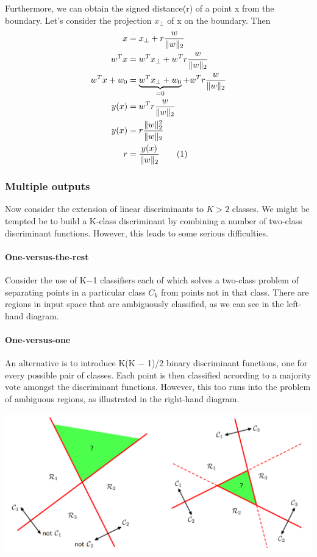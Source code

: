 \documentclass[main.tex]{subfiles}
\newcommand\numberthis{\addtocounter{equation}{1}\tag{\theequation}}
\begin{document}
Furthermore, we can obtain the signed distance(r) of a point x from the boundary. Let's consider the projection $x_{\perp}$ of x on the boundary. Then
\begin{align*}
    x &= x_{\perp} + r\frac{w}{\| w \|_2} \\
    w^Tx &= w^T x_{\perp} + w^T r\frac{w}{\| w \|_2} \\
    w^Tx + w_0 &= \underbrace{w^T x_{\perp} + w_0}_{=0} + w^T r\frac{w}{\| w \|_2} \\
    y(x) &= w^T r\frac{w}{\| w \|_2} \\
    y(x) &= r\frac{\| w \|_2^2}{\| w \|_2} \\
    r &= \frac{y(x)}{\| w \|_2} \numberthis
\end{align*}

\subsubsection{Multiple outputs}
Now consider the extension of linear discriminants to $K>2$ classes. We might be tempted be to build a K-class discriminant by combining a number of two-class discriminant functions. However, this leads to some serious difficulties.
\paragraph{One-versus-the-rest}
Consider the use of K−1 classifiers each of which solves a two-class problem of separating points in a particular class $C_k$ from points not in that class. There are regions in input space that are ambiguously classified, as we can see in the left-hand diagram.
\paragraph{One-versus-one}
An alternative is to introduce K(K − 1)/2 binary discriminant functions, one for every possible pair of classes. Each
point is then classified according to a majority vote amongst the discriminant functions. However, this too runs into the problem of ambiguous regions, as illustrated in the right-hand diagram.
\begin{center}
    \includegraphics[scale=0.5]{img/Multiclass_classification.PNG}
\end{center}
\end{document}
